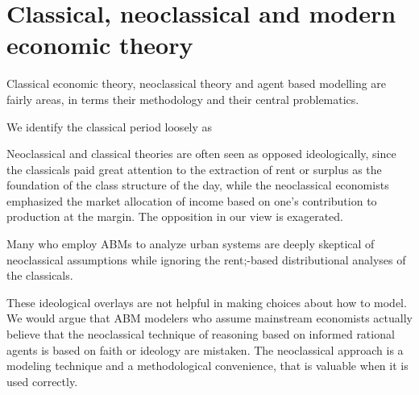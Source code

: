 {%


\section{Classical, neoclassical and modern economic theory} 

Classical economic theory, neoclassical theory and agent based modelling are  fairly areas, in terms their methodology and their central problematics. 

We identify the classical period loosely as 

Neoclassical and classical theories are often seen as opposed ideologically, since the classicals paid great attention to the extraction of rent or surplus  as the foundation of the class structure of the day, while the neoclassical  economists emphasized the market allocation of income based on one's contribution to production at the margin. The  opposition in our view is exagerated. 
 

Many  who employ ABMs to analyze urban systems are deeply skeptical of neoclassical assumptions while ignoring the rent;-based distributional analyses of the classicals.

These ideological overlays are not helpful in making choices about how to model. We would argue that ABM modelers who assume mainstream economists actually believe that the neoclassical technique of reasoning based on informed rational agents is based on faith or ideology are mistaken. The neoclassical approach is a modeling technique and a methodological convenience, that is valuable when it is used correctly.  

}

